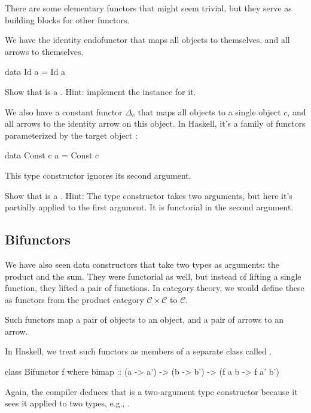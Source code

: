 \documentclass[DaoFP]{subfiles}
\begin{document}
There are some elementary functors that might seem trivial, but they serve as building blocks for other functors. 

We have the identity endofunctor that maps all objects to themselves, and all arrows to themselves. 
\begin{haskell}
data Id a = Id a
\end{haskell}
\begin{exercise}
Show that  is a . Hint: implement the  instance for it.
\end{exercise}


We also have a constant functor $\Delta_c$ that maps all objects to a single object $c$, and all arrows to the identity arrow on this object. In Haskell, it's a family of functors parameterized by the target object :
\begin{haskell}
data Const c a = Const c
\end{haskell}
This type constructor ignores its second argument.


\begin{exercise}
Show that  is a . Hint: The type constructor takes two arguments, but here it's partially applied to the first argument. It is functorial in the second argument.
\end{exercise}


\subsection{Bifunctors}

We have also seen data constructors that take two types as arguments: the product and the sum. They were functorial as well, but instead of lifting a single function, they lifted a pair of functions. In category theory, we would define these as functors from the product category $\mathcal{C} \times \mathcal{C}$ to $\mathcal{C}$.

Such functors map a pair of objects to an object, and a pair of arrows to an arrow. 

In Haskell, we treat such functors as members of a separate class called .

\begin{haskell}
class Bifunctor f where
  bimap :: (a -> a') -> (b -> b') -> (f a b -> f a' b')
\end{haskell}
Again, the compiler deduces that  is a two-argument type constructor because it sees it applied to two types, e.g., .
\end{document}
